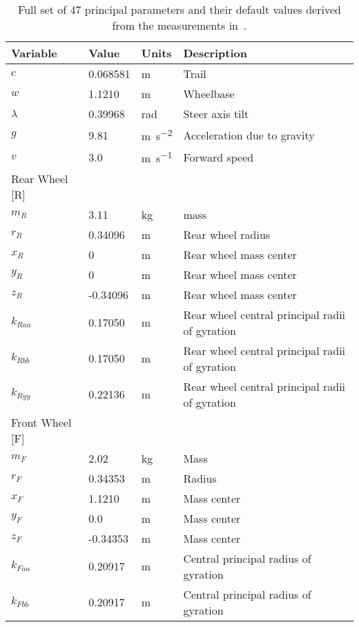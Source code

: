 \documentclass{bmd2019a}
\begin{document}
\begin{table}
  \caption{Full set of 47 principal parameters and their default values derived
  from the measurements in~\cite{Moore2012}.}
  \label{tab:parameters}
  \centering
  \begin{tabular}{llll}
    \toprule
    Variable & Value & Units & Description \\
    \midrule
    $c$ &  0.068581 & \si{\meter} & Trail \\
    $w$ &  1.1210 & \si{\meter} & Wheelbase \\
    $\lambda$ &  0.39968 & \si{\radian} & Steer axis tilt \\
    $g$ &  9.81 & \si{\meter\per\second\squared} & Acceleration due to gravity \\
    $v$ &  3.0 & \si{\meter\per\second} & Forward speed \\
    Rear Wheel [R] & & \\
    \midrule
    $m_R$ &  3.11 & \si{\kilogram} & mass \\
    $r_R$ &  0.34096 & \si{\meter} & Rear wheel radius \\
    $x_R$ & 0 & \si{\meter} & Rear wheel mass center \\
    $y_R$ & 0 & \si{\meter} & Rear wheel mass center \\
    $z_R$ & -0.34096 & \si{\meter} & Rear wheel mass center \\
    $k_{Raa}$ &  0.17050 & \si{\meter} & Rear wheel central principal radii of gyration \\
    $k_{Rbb}$ &  0.17050 & \si{\meter} & Rear wheel central principal radii of gyration  \\
    $k_{Ryy}$ &  0.22136 & \si{\meter} & Rear wheel central principal radii of gyration \\
    Front Wheel [F] & & \\
    \midrule
    $m_F$ &  2.02 & \si{\kilogram} & Mass \\
    $r_F$ &  0.34353 & \si{\meter} & Radius \\
    $x_F$ &  1.1210 & \si{\meter} & Mass center \\
    $y_F$ & 0.0 & \si{\meter} & Mass center \\
    $z_F$ & -0.34353 & \si{\meter} & Mass center \\
    $k_{Faa}$ &  0.20917 & \si{\meter} & Central principal radius of gyration \\
    $k_{Fbb}$ &  0.20917 & \si{\meter} & Central principal radius of gyration \\

\end{tabular}
\end{table}
\end{document}
